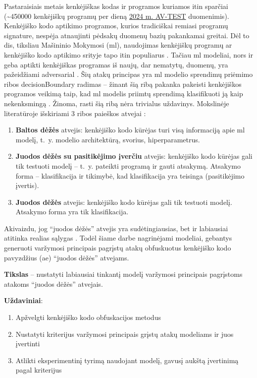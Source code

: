
Pastaraisiais metais kenkėjiškas kodas ir programos kuriamos itin sparčiai (\sim450000 kenkėjiškų programų per dieną \href{https://www.av-test.org/en/statistics/malware/}{2024 m. AV-TEST} duomenimis). Kenkėjiško kodo aptikimo programos, kurios tradiciškai remiasi programų \gls{signature}, nespėja atnaujinti pėdsakų duomenų bazių pakankamai greitai. Dėl to \acfp{di}, tiksliau Mašininio Mokymosi (\acs{ml}), naudojimas kenkėjiškų programų ar kenkėjiško kodo aptikimo srityje tapo itin populiarus \cite{demetrioAdversarialEXEmplesSurvey2021}. Tačiau \ac{ml} modeliai, nors ir geba aptikti kenkėjiškas programas iš naujų, dar nematytų, duomenų, yra pažeidžiami \gls{adversarial} \cite{castroAIMEDEvolvingMalware2019,huGeneratingAdversarialMalware2017,rosenbergGenericBlackBoxEndEnd2018,zhongReinforcementLearningBased2022}. Šių atakų principas yra \ac{ml} modelio sprendimų priėmimo ribos \gls{decisionBoundary} radimas -- žinant šią ribą pakanka pakeisti kenkėjiškos programos veikimą taip, kad \ac{ml} modelis priimtų sprendimą klasifikuoti ją kaip nekenksmingą \cite{demetrioAdversarialEXEmplesSurvey2021}. Žinoma, rasti šią ribą nėra trivialus uždavinys. Mokslinėje literatūroje išskiriami 3 ribos paieškos atvejai \cite{fangEvadingMalwareEngines2019}:
\begin{enumerate}
    \item \textbf{Baltos dėžės} atvejis: kenkėjiško kodo kūrėjas turi visą informaciją apie \ac{ml} modelį, t.~y. modelio architektūrą, svorius, hiperparametrus.
    \item \textbf{Juodos dėžės su pasitikėjimo įverčiu} atvejis: kenkėjiško kodo kūrėjas gali tik testuoti modelį -- t.~y. pateikti programą ir gauti atsakymą. Atsakymo forma -- klasifikacija ir tikimybė, kad klasifikacija yra teisinga (pasitikėjimo įvertis).
    \item \textbf{Juodos dėžės} atvejis: kenkėjiško kodo kūrėjas gali tik testuoti modelį. Atsakymo forma yra tik klasifikacija.
\end{enumerate}
Akivaizdu, jog \enquote{juodos dėžės} atvejis yra sudėtingiausias, bet ir labiausiai atitinka realias sąlygas \citeplace. Todėl šiame darbe nagrinėjami modeliai, gebantys generuoti varžymosi principais pagrįstų atakų obfuskuotus kenkėjiško kodo pavyzdžius (\acs{ae}) \enquote{juodos dėžės} atvejams.

\vspace{10pt}
\textbf{Tikslas} -- nustatyti labiausiai tinkantį modelį varžymosi principais pagrįstoms atakoms \enquote{juodos dėžės} atvejais.

\vspace{10pt}
\textbf{Uždaviniai}:
\begin{enumerate}
    \item Apžvelgti kenkėjiško kodo obfuskacijos metodus
    \item Nustatyti kriterijus varžymosi principais grįstų atakų modeliams ir juos įvertinti
    \item Atlikti eksperimentinį tyrimą naudojant modelį, gavusį aukštą įvertinimą pagal kriterijus
\end{enumerate}